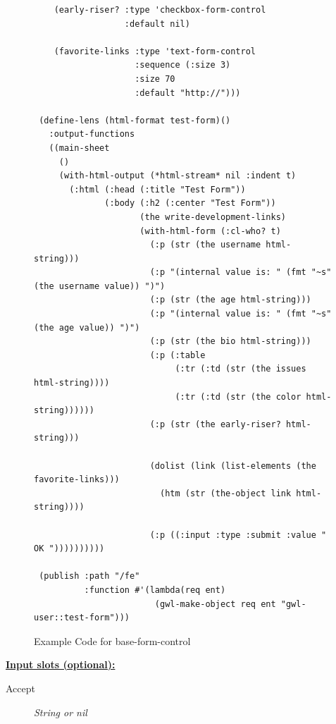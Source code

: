 \documentclass [11pt]{book}
\begin{document}
\begin{itemize}
\begin{figure}
\begin{lrbox}{\boxedverb}
\begin{minipage}{\linewidth}
{\begin{verbatim}
    (early-riser? :type 'checkbox-form-control
                  :default nil)
   
    (favorite-links :type 'text-form-control
                    :sequence (:size 3)
                    :size 70
                    :default "http://")))

 (define-lens (html-format test-form)()
   :output-functions
   ((main-sheet
     ()
     (with-html-output (*html-stream* nil :indent t)
       (:html (:head (:title "Test Form"))
              (:body (:h2 (:center "Test Form"))
                     (the write-development-links)
                     (with-html-form (:cl-who? t)
                       (:p (str (the username html-string)))
                       (:p "(internal value is: " (fmt "~s" (the username value)) ")")
                       (:p (str (the age html-string)))
                       (:p "(internal value is: " (fmt "~s" (the age value)) ")")
                       (:p (str (the bio html-string)))
                       (:p (:table 
                            (:tr (:td (str (the issues html-string))))
                            (:tr (:td (str (the color html-string))))))
                       (:p (str (the early-riser? html-string)))
                      
                       (dolist (link (list-elements (the favorite-links)))
                         (htm (str (the-object link html-string))))
                      
                       (:p ((:input :type :submit :value " OK "))))))))))
 
 (publish :path "/fe"
          :function #'(lambda(req ent)
                        (gwl-make-object req ent "gwl-user::test-form")))

\end{verbatim}}
\end{minipage}
\end{lrbox}
\fbox{\usebox{\boxedverb}}

\caption{Example Code for base-form-control}

\label{fig:example-code-base-form-control}

\end{figure}





\textbf{
\underline{Input slots (optional):}}

\begin{description}

\item [Accept]
\emph{String or nil}


\end{description}
\end{itemize}
\end{document}
